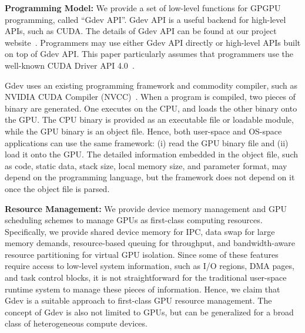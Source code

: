 \textbf{Programming Model:}
We provide a set of low-level functions for GPGPU programming, called
``Gdev API''.
Gdev API is a useful backend for high-level APIs, such as CUDA.
The details of Gdev API can be found at our project website~\cite{Gdev}.
Programmers may use either Gdev API directly or high-level APIs built
on top of Gdev API.
This paper particularly assumes that programmers use the well-known CUDA
Driver API 4.0~\cite{CUDA40}.

Gdev uses an existing programming framework and commodity compiler, such
as NVIDIA CUDA Compiler (NVCC)~\cite{CUDA40}.
When a program is compiled, two pieces of binary are generated.
One executes on the CPU, and loads the other binary onto the GPU.
The CPU binary is provided as an executable file or loadable module,
while the GPU binary is an object file.
Hence, both user-space and OS-space applications can use the same
framework: (i) read the GPU binary file and (ii) load it onto the GPU.
The detailed information embedded in the object file, such as code,
static data, stack size, local memory size, and parameter format, may
depend on the programming language, but the framework does not depend on
it once the object file is parsed.

\textbf{Resource Management:}
We provide device memory management and GPU scheduling schemes to manage
GPUs as first-class computing resources.
Specifically, we provide shared device memory for IPC, data swap for
large memory demands, resource-based queuing for throughput, and
bandwidth-aware resource partitioning for virtual GPU isolation.
Since some of these features require access to low-level system
information, such as I/O regions, DMA pages, and task control blocks, it
is not straightforward for the traditional user-space runtime system to
manage these pieces of information.
Hence, we claim that Gdev is a suitable approach to first-class GPU
resource management.
The concept of Gdev is also not limited to GPUs, but can be
generalized for a broad class of heterogeneous compute devices.

